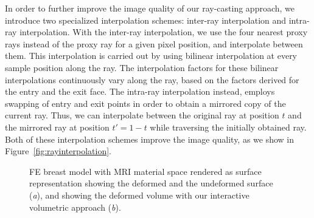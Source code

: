 \documentclass[review,journal]{vgtc}         %
\begin{document}
In order to further improve the image quality of our ray-casting approach, we introduce two specialized interpolation schemes: inter-ray interpolation and intra-ray interpolation. With the inter-ray interpolation, we use the four nearest proxy rays  instead of the proxy ray for a given pixel position, and interpolate between them. This interpolation is carried out by using bilinear interpolation at every sample position along the ray. The interpolation factors for these bilinear interpolations continuously vary along the ray, based on the factors derived for the entry and the exit face. The intra-ray interpolation instead, employs swapping of entry and exit points in order to obtain a mirrored copy of the current ray. Thus, we can interpolate between the original ray at position $t$ and the mirrored ray at position $t'=1-t$ while traversing the initially obtained ray. Both of these interpolation schemes improve the image quality, as we show in Figure~\ref{fig:rayinterpolation}.

\begin{figure}
    \centering 
    \caption{FE breast model with MRI material space rendered as surface representation showing the deformed and the undeformed surface ({\it a}), and showing the deformed volume with our interactive volumetric approach ({\it b}).}
    \label{fig:breast}
\end{figure}
\end{document}
